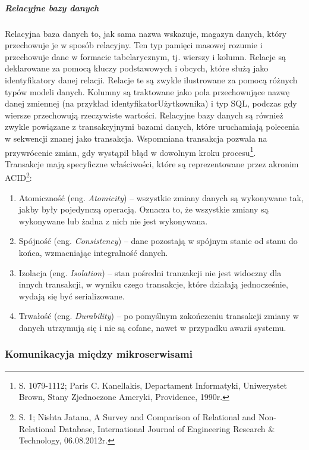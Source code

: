 \documentclass[12pt, a4paper, twoside, openany]{book}
\newcommand{\forceindent}{\leavevmode{\parindent=1.3em\indent}}
\begin{document}
\subparagraph{Relacyjne bazy danych\\}
\forceindent Relacyjna baza danych to, jak sama nazwa wskazuje, magazyn danych, który przechowuje je w sposób relacyjny.
Ten typ pamięci masowej rozumie i przechowuje dane w formacie tabelarycznym, tj. wierszy i kolumn.
Relacje są deklarowane za pomocą kluczy podstawowych i obcych, które służą jako identyfikatory danej relacji.
Relacje te są zwykle ilustrowane za pomocą różnych typów modeli danych.
Kolumny są traktowane jako pola przechowujące nazwę danej zmiennej (na przykład identyfikatorUżytkownika) i typ SQL, podczas gdy wiersze przechowują rzeczywiste wartości.
Relacyjne bazy danych są również zwykle powiązane z transakcyjnymi bazami danych, które uruchamiają polecenia w sekwencji znanej jako transakcja.
Wspomniana transakcja pozwala na przywrócenie zmian, gdy wystąpił błąd w dowolnym kroku procesu\footnote{S. 1079-1112; Paris C. Kanellakis, Departament Informatyki, Uniwerystet Brown, Stany Zjednoczone Ameryki, Providence, 1990r.}.\\
Transakcje mają specyficzne właściwości, które są reprezentowane przez akronim ACID\footnote{S. 1; Nishta Jatana, A Survey and Comparison of Relational and Non-Relational Database, International Journal of Engineering Research \& Technology, 06.08.2012r.}:
\begin{enumerate}[label=--]
    \item Atomiczność (eng. \textit{Atomicity}) -- wszystkie zmiany danych są wykonywane tak, jakby były pojedynczą operacją. Oznacza to, że wszystkie zmiany są wykonywane lub żadna z nich nie jest wykonywana.
    \item Spójność (eng. \textit{Consistency}) -- dane pozostają w spójnym stanie od stanu do końca, wzmacniając integralność danych.
    \item Izolacja (eng. \textit{Isolation}) -- stan pośredni tranzakcji nie jest widoczny dla innych transakcji, w wyniku czego transakcje, które działają jednocześnie, wydają się być serializowane.
    \item Trwałość (eng. \textit{Durability}) -- po pomyślnym zakończeniu transakcji zmiany w danych utrzymują się i nie są cofane, nawet w przypadku awarii systemu.
\end{enumerate}


\subsubsection{Komunikacyja między mikroserwisami}
\end{document}
